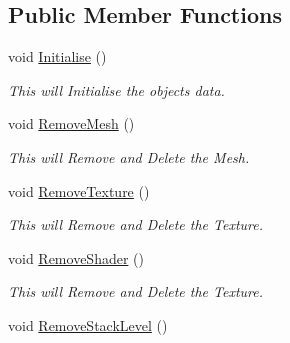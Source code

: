 \subsection*{Public Member Functions}
\begin{DoxyCompactItemize}
\item 
\hypertarget{classc_mesh_tree_node_a043efc30a09c9a474d75b7c5e79abccc}{
void \hyperlink{classc_mesh_tree_node_a043efc30a09c9a474d75b7c5e79abccc}{Initialise} ()}
\label{classc_mesh_tree_node_a043efc30a09c9a474d75b7c5e79abccc}

\begin{DoxyCompactList}\small\item\em This will Initialise the objects data. \end{DoxyCompactList}\item 
\hypertarget{classc_mesh_tree_node_ac75b9a8974308873997ad6fcc5baa0da}{
void \hyperlink{classc_mesh_tree_node_ac75b9a8974308873997ad6fcc5baa0da}{RemoveMesh} ()}
\label{classc_mesh_tree_node_ac75b9a8974308873997ad6fcc5baa0da}

\begin{DoxyCompactList}\small\item\em This will Remove and Delete the Mesh. \end{DoxyCompactList}\item 
\hypertarget{classc_mesh_tree_node_ab3c5c436df69d8f6ef8a5348e76f5784}{
void \hyperlink{classc_mesh_tree_node_ab3c5c436df69d8f6ef8a5348e76f5784}{RemoveTexture} ()}
\label{classc_mesh_tree_node_ab3c5c436df69d8f6ef8a5348e76f5784}

\begin{DoxyCompactList}\small\item\em This will Remove and Delete the Texture. \end{DoxyCompactList}\item 
\hypertarget{classc_mesh_tree_node_a1cf77a1217e21896c7b96df67da9f10f}{
void \hyperlink{classc_mesh_tree_node_a1cf77a1217e21896c7b96df67da9f10f}{RemoveShader} ()}
\label{classc_mesh_tree_node_a1cf77a1217e21896c7b96df67da9f10f}

\begin{DoxyCompactList}\small\item\em This will Remove and Delete the Texture. \end{DoxyCompactList}\item 
\hypertarget{classc_mesh_tree_node_a289e7a882f0304a0e2738a7cca5db60d}{
void \hyperlink{classc_mesh_tree_node_a289e7a882f0304a0e2738a7cca5db60d}{RemoveStackLevel} ()}
\label{classc_mesh_tree_node_a289e7a882f0304a0e2738a7cca5db60d}


\end{DoxyCompactItemize}

